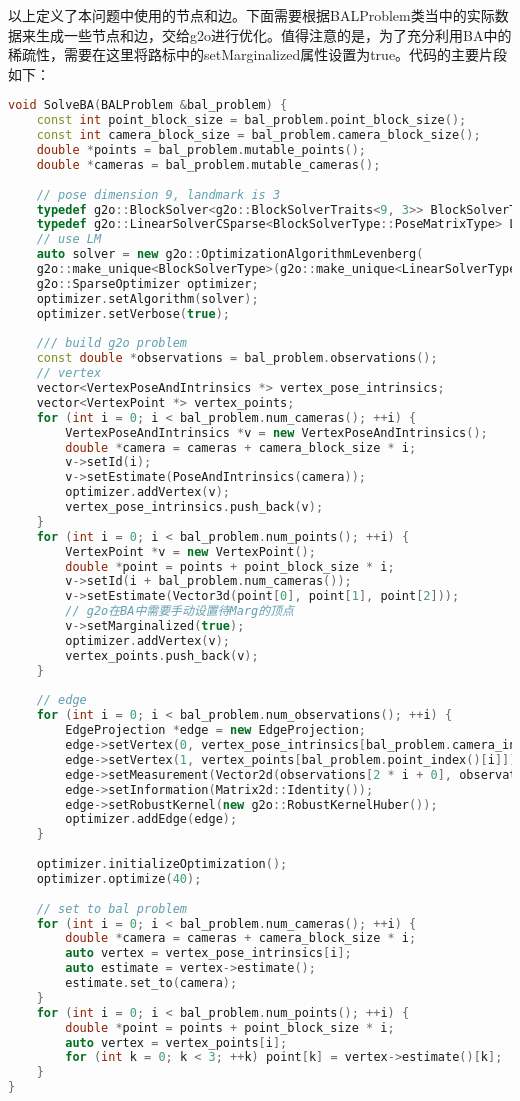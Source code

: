 以上定义了本问题中使用的节点和边。下面需要根据BALProblem类当中的实际数据来生成一些节点和边，交给g2o进行优化。值得注意的是，为了充分利用BA中的稀疏性，需要在这里将路标中的setMarginalized属性设置为true。代码的主要片段如下：
\begin{lstlisting}[language=c++,caption=slambook2/ch9/bundle_adjustment_g2o（片段）]
void SolveBA(BALProblem &bal_problem) {
	const int point_block_size = bal_problem.point_block_size();
	const int camera_block_size = bal_problem.camera_block_size();
	double *points = bal_problem.mutable_points();
	double *cameras = bal_problem.mutable_cameras();
	
	// pose dimension 9, landmark is 3
	typedef g2o::BlockSolver<g2o::BlockSolverTraits<9, 3>> BlockSolverType;
	typedef g2o::LinearSolverCSparse<BlockSolverType::PoseMatrixType> LinearSolverType;
	// use LM
	auto solver = new g2o::OptimizationAlgorithmLevenberg(
	g2o::make_unique<BlockSolverType>(g2o::make_unique<LinearSolverType>()));
	g2o::SparseOptimizer optimizer;
	optimizer.setAlgorithm(solver);
	optimizer.setVerbose(true);
	
	/// build g2o problem
	const double *observations = bal_problem.observations();
	// vertex
	vector<VertexPoseAndIntrinsics *> vertex_pose_intrinsics;
	vector<VertexPoint *> vertex_points;
	for (int i = 0; i < bal_problem.num_cameras(); ++i) {
		VertexPoseAndIntrinsics *v = new VertexPoseAndIntrinsics();
		double *camera = cameras + camera_block_size * i;
		v->setId(i);
		v->setEstimate(PoseAndIntrinsics(camera));
		optimizer.addVertex(v);
		vertex_pose_intrinsics.push_back(v);
	}
	for (int i = 0; i < bal_problem.num_points(); ++i) {
		VertexPoint *v = new VertexPoint();
		double *point = points + point_block_size * i;
		v->setId(i + bal_problem.num_cameras());
		v->setEstimate(Vector3d(point[0], point[1], point[2]));
		// g2o在BA中需要手动设置待Marg的顶点
		v->setMarginalized(true);
		optimizer.addVertex(v);
		vertex_points.push_back(v);
	}
	
	// edge
	for (int i = 0; i < bal_problem.num_observations(); ++i) {
		EdgeProjection *edge = new EdgeProjection;
		edge->setVertex(0, vertex_pose_intrinsics[bal_problem.camera_index()[i]]);
		edge->setVertex(1, vertex_points[bal_problem.point_index()[i]]);
		edge->setMeasurement(Vector2d(observations[2 * i + 0], observations[2 * i + 1]));
		edge->setInformation(Matrix2d::Identity());
		edge->setRobustKernel(new g2o::RobustKernelHuber());
		optimizer.addEdge(edge);
	}
	
	optimizer.initializeOptimization();
	optimizer.optimize(40);
	
	// set to bal problem
	for (int i = 0; i < bal_problem.num_cameras(); ++i) {
		double *camera = cameras + camera_block_size * i;
		auto vertex = vertex_pose_intrinsics[i];
		auto estimate = vertex->estimate();
		estimate.set_to(camera);
	}
	for (int i = 0; i < bal_problem.num_points(); ++i) {
		double *point = points + point_block_size * i;
		auto vertex = vertex_points[i];
		for (int k = 0; k < 3; ++k) point[k] = vertex->estimate()[k];
	}
}
\end{lstlisting}
